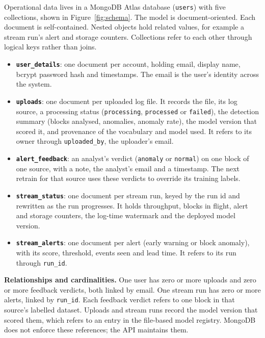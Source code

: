 Operational data lives in a MongoDB Atlas database (\texttt{users}) with five collections, shown in Figure~\ref{fig:schema}. The model is document-oriented. Each document is self-contained. Nested objects hold related values, for example a stream run's alert and storage counters. Collections refer to each other through logical keys rather than joins.

\begin{itemize}
  \item \textbf{\texttt{user\_details}}: one document per account, holding email, display name, bcrypt password hash and timestamps. The email is the user's identity across the system.
  \item \textbf{\texttt{uploads}}: one document per uploaded log file. It records the file, its log source, a processing status (\texttt{processing}, \texttt{processed} or \texttt{failed}), the detection summary (blocks analysed, anomalies, anomaly rate), the model version that scored it, and provenance of the vocabulary and model used. It refers to its owner through \texttt{uploaded\_by}, the uploader's email.
  \item \textbf{\texttt{alert\_feedback}}: an analyst's verdict (\texttt{anomaly} or \texttt{normal}) on one block of one source, with a note, the analyst's email and a timestamp. The next retrain for that source uses these verdicts to override its training labels.
  \item \textbf{\texttt{stream\_status}}: one document per stream run, keyed by the run id and rewritten as the run progresses. It holds throughput, blocks in flight, alert and storage counters, the log-time watermark and the deployed model version.
  \item \textbf{\texttt{stream\_alerts}}: one document per alert (early warning or block anomaly), with its score, threshold, events seen and lead time. It refers to its run through \texttt{run\_id}.
\end{itemize}

\textbf{Relationships and cardinalities.} One user has zero or more uploads and zero or more feedback verdicts, both linked by email. One stream run has zero or more alerts, linked by \texttt{run\_id}. Each feedback verdict refers to one block in that source's labelled dataset. Uploads and stream runs record the model version that scored them, which refers to an entry in the file-based model registry. MongoDB does not enforce these references; the API maintains them.

